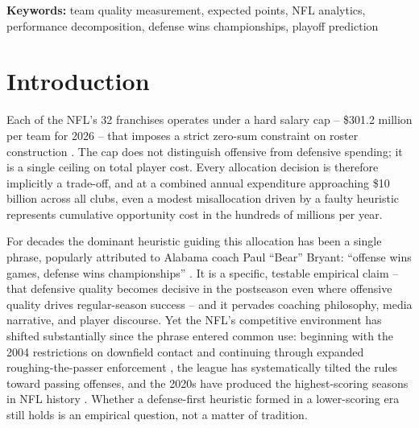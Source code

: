 \documentclass[12pt,a4paper]{article}
\begin{document}
\textbf{Keywords:} team quality measurement, expected points, NFL analytics, performance decomposition, defense wins championships, playoff prediction

\section{Introduction}
\label{sec:introduction}

Each of the NFL's 32 franchises operates under a hard salary cap -- \$301.2 million per team for 2026 \citep{nfl2026cap} -- that imposes a strict zero-sum constraint on roster construction \citep{nflcba2020}. The cap does not distinguish offensive from defensive spending; it is a single ceiling on total player cost. Every allocation decision is therefore implicitly a trade-off, and at a combined annual expenditure approaching \$10 billion across all clubs, even a modest misallocation driven by a faulty heuristic represents cumulative opportunity cost in the hundreds of millions per year.

For decades the dominant heuristic guiding this allocation has been a single phrase, popularly attributed to Alabama coach Paul ``Bear'' Bryant: ``offense wins games, defense wins championships'' \citep{williams2010bearbryant}. It is a specific, testable empirical claim -- that defensive quality becomes decisive in the postseason even where offensive quality drives regular-season success -- and it pervades coaching philosophy, media narrative, and player discourse. Yet the NFL's competitive environment has shifted substantially since the phrase entered common use: beginning with the 2004 restrictions on downfield contact \citep{nflops2004rules} and continuing through expanded roughing-the-passer enforcement \citep{pereira2018roughing}, the league has systematically tilted the rules toward passing offenses, and the 2020s have produced the highest-scoring seasons in NFL history \citep{barnwell2019passingrevolution, nflscoring2023trends}. Whether a defense-first heuristic formed in a lower-scoring era still holds is an empirical question, not a matter of tradition.
\end{document}
